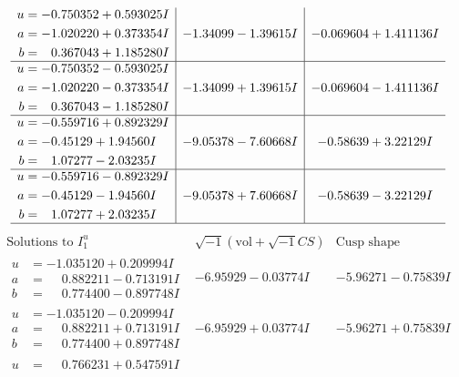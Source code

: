 \documentclass[1p]{elsarticle_modified}
\theoremstyle{definition}
\newcommand{\I}{\sqrt{-1}}
\begin{document}
$$\begin{array}{c|c|c}
\begin{aligned}
u &= -0.750352 + 0.593025 I \\
a &= -1.020220 + 0.373354 I \\
b &= \phantom{-}0.367043 + 1.185280 I\end{aligned}
 & -1.34099 - 1.39615 I & -0.069604 + 1.411136 I \\ \hline\begin{aligned}
u &= -0.750352 - 0.593025 I \\
a &= -1.020220 - 0.373354 I \\
b &= \phantom{-}0.367043 - 1.185280 I\end{aligned}
 & -1.34099 + 1.39615 I & -0.069604 - 1.411136 I \\ \hline\begin{aligned}
u &= -0.559716 + 0.892329 I \\
a &= -0.45129 + 1.94560 I \\
b &= \phantom{-}1.07277 - 2.03235 I\end{aligned}
 & -9.05378 - 7.60668 I & -0.58639 + 3.22129 I \\ \hline\begin{aligned}
u &= -0.559716 - 0.892329 I \\
a &= -0.45129 - 1.94560 I \\
b &= \phantom{-}1.07277 + 2.03235 I\end{aligned}
 & -9.05378 + 7.60668 I & -0.58639 - 3.22129 I\\
 \hline 
 \end{array}$$\newpage$$\begin{array}{c|c|c}  
\text{Solutions to }I^u_{1}& \I (\text{vol} + \sqrt{-1}CS) & \text{Cusp shape}\\
 \hline 
\begin{aligned}
u &= -1.035120 + 0.209994 I \\
a &= \phantom{-}0.882211 - 0.713191 I \\
b &= \phantom{-}0.774400 - 0.897748 I\end{aligned}
 & -6.95929 - 0.03774 I & -5.96271 - 0.75839 I \\ \hline\begin{aligned}
u &= -1.035120 - 0.209994 I \\
a &= \phantom{-}0.882211 + 0.713191 I \\
b &= \phantom{-}0.774400 + 0.897748 I\end{aligned}
 & -6.95929 + 0.03774 I & -5.96271 + 0.75839 I \\ \hline\begin{aligned}
u &= \phantom{-}0.766231 + 0.547591 I \\

\end{aligned}
\end{array}$$
\end{document}
